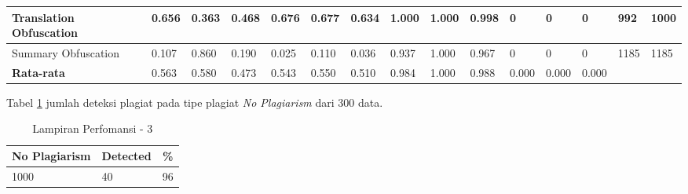 \documentclass[../Proposal.tex]{subfiles}
\begin{document}
\begin{table}[H]
{\begin{tabular}{|l|l|l|l|l|l|l|l|l|l|l|l|l|ll}
			Translation Obfuscation                     & 0.656                          & 0.363                       & 0.468                   & 0.676                          & 0.677                       & 0.634                   & 1.000                          & 1.000                       & 0.998                   & 0                              & 0                           & 0                       & \multicolumn{1}{l|}{992}                          & \multicolumn{1}{l|}{1000}               \\ \hline
			Summary Obfuscation                         & 0.107                          & 0.860                       & 0.190                   & 0.025                          & 0.110                       & 0.036                   & 0.937                          & 1.000                       & 0.967                   & 0                              & 0                           & 0                       & \multicolumn{1}{l|}{1185}                         & \multicolumn{1}{l|}{1185}               \\ \hline
			\textbf{Rata-rata}                          & 0.563                          & 0.580                       & 0.473                   & 0.543                          & 0.550                       & 0.510                   & 0.984                          & 1.000                       & 0.988                   & 0.000                          & 0.000                       & 0.000                   &                                                   &                                         \\ \cline{1-13}
		\end{tabular}
	}
	\end{table}


	\noindent Tabel \ref{lamp3} jumlah deteksi plagiat pada tipe plagiat \textit{No Plagiarism} dari 300 data. 
	
	\begin{table}[H]
		\centering
		
		\caption{Lampiran Perfomansi - 3}
		\label{lamp3}
		\begin{tabular}{|l|l|l|}
			\hline
			\multicolumn{1}{|c|}{No Plagiarism} & \multicolumn{1}{c|}{Detected} & \multicolumn{1}{c|}{\%} \\ \hline
			1000                                & 40                            & 96                      \\ \hline
		\end{tabular}
	\end{table}
	
\end{document}

